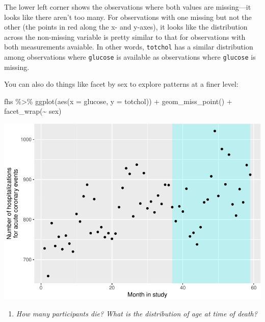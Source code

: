 \documentclass[
]{book}
\newenvironment{Shaded}{\begin{snugshade}}{\end{snugshade}}
\newcommand{\AttributeTok}[1]{\textcolor[rgb]{0.77,0.63,0.00}{#1}}
\newcommand{\FunctionTok}[1]{\textcolor[rgb]{0.00,0.00,0.00}{#1}}
\newcommand{\NormalTok}[1]{#1}
\newcommand{\SpecialCharTok}[1]{\textcolor[rgb]{0.00,0.00,0.00}{#1}}
\providecommand{\tightlist}{%
  \setlength{\itemsep}{0pt}\setlength{\parskip}{0pt}}
\begin{document}
The lower left corner shows the observations where both values are missing---it
looks like there aren't too many. For observations with one missing but not the
other (the points in red along the x- and y-axes), it looks like the distribution
across the non-missing variable is pretty similar to that for observations
with both measurements avaiable. In other words, \texttt{totchol} has a similar
distribution among observations where \texttt{glucose} is available as observations
where \texttt{glucose} is missing.

You can also do things like facet by sex to explore patterns at a finer level:

\begin{Shaded}
\begin{Highlighting}[]
\NormalTok{fhs }\SpecialCharTok{\%\textgreater{}\%} 
  \FunctionTok{ggplot}\NormalTok{(}\FunctionTok{aes}\NormalTok{(}\AttributeTok{x =}\NormalTok{ glucose, }\AttributeTok{y =}\NormalTok{ totchol)) }\SpecialCharTok{+} 
  \FunctionTok{geom\_miss\_point}\NormalTok{() }\SpecialCharTok{+} 
  \FunctionTok{facet\_wrap}\NormalTok{(}\SpecialCharTok{\textasciitilde{}}\NormalTok{ sex)}
\end{Highlighting}
\end{Shaded}

\includegraphics{adv_epi_analysis_files/figure-latex/unnamed-chunk-124-1.pdf}

\begin{enumerate}
\def\labelenumi{\arabic{enumi}.}
\setcounter{enumi}{2}
\tightlist
\item
  \emph{How many participants die? What is the distribution of age at time of death?}
\end{enumerate}
\end{document}

